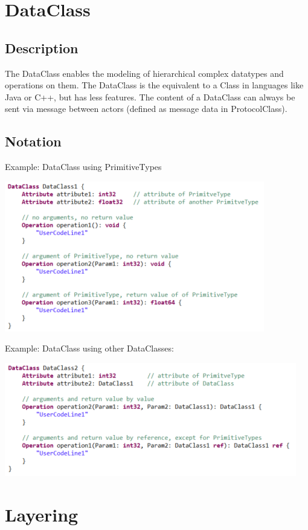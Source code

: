 \section{DataClass}

\subsection{Description}

The DataClass enables the modeling of hierarchical complex datatypes and operations on them. The DataClass 
is the equivalent to a Class in languages like Java or C++, but has less features. The content of a 
DataClass can always be sent via message between actors (defined as message data in ProtocolClass).

\subsection{Notation}
  
Example: DataClass using PrimitiveTypes

\includegraphics{images/040-DataClass1.png}

Example: DataClass using other DataClasses:

\includegraphics{images/040-DataClass2.png}

\section{Layering}

